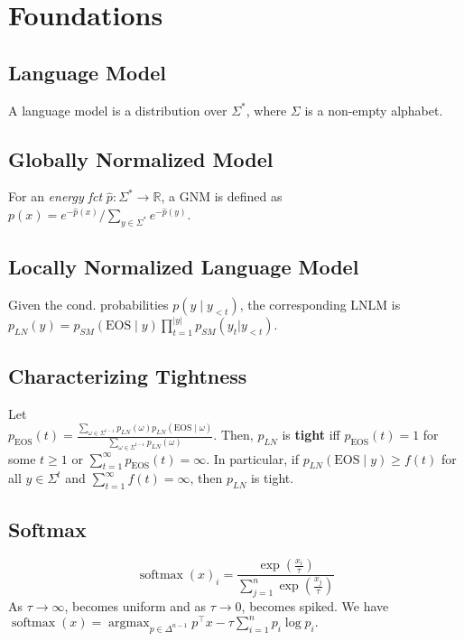 \section{Foundations}
\subsection*{Language Model}
A language model is a distribution over $\Sigma^*$, where $\Sigma$ is a non-empty alphabet.

\subsection*{Globally Normalized Model}
For an \textit{energy fct} $\hat{p}: \Sigma^* \rightarrow \mathbb{R}$, a {GNM} is defined as $p(x) = {e^{-\hat{p}(x)}}/\sum_{y\in\Sigma^*}e^{-\hat{p}(y)}$.

\subsection*{Locally Normalized Language Model}
Given the cond. probabilities $p(y\mid y_{<t})$, the corresponding {LNLM} is \\
$p_{LN}(y) = p_{SM}(\text{EOS}\mid y)\prod_{t=1}^{|y|} p_{SM}(y_t| y_{<t})$.

\subsection*{Characterizing Tightness}
Let \\
$\displaystyle p_{\text{EOS}}(t)=\frac{\sum_{\omega\in\Sigma^{t-1}}^{}p_{LN}(\omega)
    p_{LN}(\text{EOS}\mid\omega)}{\sum_{\omega\in\Sigma^{t-1}}^{} p_{LN}(\omega)}.$
Then, $p_{LN}$ is \textbf{tight} iff $p_{\text{EOS}}(t)=1$ for some $t\geq 1$ or $\sum_{t=1}^{\infty} p_{\text{EOS}}(t) = \infty$. In particular, if $p_{LN}(\text{EOS}\mid y)\geq f(t)$ for all $y\in\Sigma^t$ and $\sum_{t=1}^{\infty}f(t)=\infty$, then $p_{LN}$ is tight.

\subsection*{Softmax}
$$\operatorname{softmax}(x)_i = \frac{\exp(\frac{x_i}{\tau})}{\sum_{j=1}^n \exp(\frac{x_j}{\tau})}$$
As $\tau\rightarrow \infty$, becomes uniform and as $\tau\rightarrow 0$, becomes spiked. We have\\
$\operatorname{softmax}(x)=\displaystyle\operatorname*{argmax}_{p\in\Delta^{n-1}} p^\top x - \tau \sum_{i=1}^{n} p_i \log p_i.$

